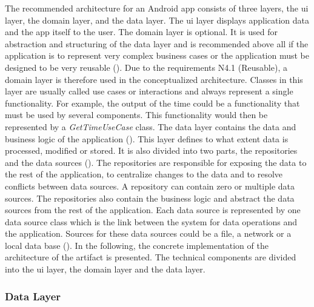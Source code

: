 The recommended architecture for an Android app consists of three layers, the \ac{ui} layer, the domain layer, and the data layer. The \ac{ui} layer displays application data and the app itself to the user.
The domain layer is optional. It is used for abstraction and structuring of the data layer and is recommended above all if the application is to represent very complex business cases or the application must be designed to be very reusable (\cite{Google.2023}). Due to the requirements N4.1 (Reusable), a domain layer is therefore used in the conceptualized architecture. Classes in this layer are usually called use cases or interactions and always represent a single functionality. For example, the output of the time could be a functionality that must be used by several components. This functionality would then be represented by a \textit{GetTimeUseCase} class. The data layer contains the data and business logic of the application (\cite{Google.2023}). This layer defines to what extent data is processed, modified or stored. It is also divided into two parts, the repositories and the data sources (\cite{Google.2023}). The repositories are responsible for exposing the data to the rest of the application, to centralize changes to the data and to resolve conflicts between data sources. A repository can contain zero or multiple data sources. The repositories also contain the business logic and abstract the data sources from the rest of the application. Each data source is represented by one data source class which is the link between the system for data operations and the application. Sources for these data sources could be a file, a network or a local data base (\cite{Google.2023}).
In the following, the concrete implementation of the architecture of the artifact is presented. The technical components are divided into the \ac{ui} layer, the domain layer and the data layer. 

\subsubsection{Data Layer}

